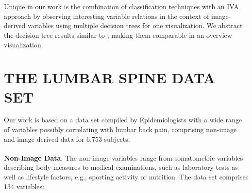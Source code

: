 \documentclass[a4paper,twoside]{style/article}
\begin{document}
\\\\
Unique in our work is the combination of classification techniques with an IVA approach by observing interesting variable relations in the context of image-derived variables using multiple decision trees for one visualization.
We abstract the decision tree results similar to \cite{Turkay}, making them comparable in an overview visualization.
\section{\uppercase{The Lumbar Spine Data Set}}
\label{sec:MaterialsAndMethod}
\noindent Our work is based on a data set compiled by Epidemiologists with a wide range of variables possibly correlating with lumbar back pain, comprising non-image and image-derived data for 6,753 subjects.
\\\\
\noindent \textbf{Non-Image Data}.
The non-image variables range from somatometric variables describing body measures to medical examinations, such as laboratory tests as well as lifestyle factors, e.g., sporting activity or nutrition.
The data set comprises 134 variables: %
\end{document}
